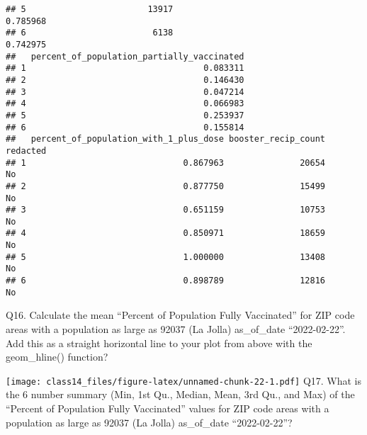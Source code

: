 \documentclass[
]{article}
\newenvironment{Shaded}{\begin{snugshade}}{\end{snugshade}}
\newcommand{\AttributeTok}[1]{\textcolor[rgb]{0.77,0.63,0.00}{#1}}
\newcommand{\FloatTok}[1]{\textcolor[rgb]{0.00,0.00,0.81}{#1}}
\newcommand{\FunctionTok}[1]{\textcolor[rgb]{0.00,0.00,0.00}{#1}}
\newcommand{\NormalTok}[1]{#1}
\newcommand{\OtherTok}[1]{\textcolor[rgb]{0.56,0.35,0.01}{#1}}
\newcommand{\SpecialCharTok}[1]{\textcolor[rgb]{0.00,0.00,0.00}{#1}}
\begin{document}
\begin{verbatim}
## 5                        13917                               0.785968
## 6                         6138                               0.742975
##   percent_of_population_partially_vaccinated
## 1                                   0.083311
## 2                                   0.146430
## 3                                   0.047214
## 4                                   0.066983
## 5                                   0.253937
## 6                                   0.155814
##   percent_of_population_with_1_plus_dose booster_recip_count redacted
## 1                               0.867963               20654       No
## 2                               0.877750               15499       No
## 3                               0.651159               10753       No
## 4                               0.850971               18659       No
## 5                               1.000000               13408       No
## 6                               0.898789               12816       No
\end{verbatim}

Q16. Calculate the mean ``Percent of Population Fully Vaccinated'' for
ZIP code areas with a population as large as 92037 (La Jolla)
as\_of\_date ``2022-02-22''. Add this as a straight horizontal line to
your plot from above with the geom\_hline() function?

\begin{Shaded}
\end{Shaded}

\texttt{[image: class14\_files/figure-latex/unnamed-chunk-22-1.pdf]} Q17.
What is the 6 number summary (Min, 1st Qu., Median, Mean, 3rd Qu., and
Max) of the ``Percent of Population Fully Vaccinated'' values for ZIP
code areas with a population as large as 92037 (La Jolla) as\_of\_date
``2022-02-22''?

\begin{Shaded}
\end{Shaded}
\end{document}

